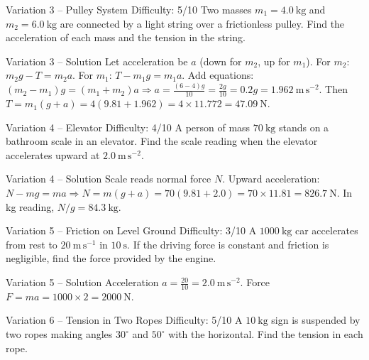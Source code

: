 \documentclass[11pt]{beamer}
\begin{document}
\begin{frame}[shrink=15]{Variation 3 – Pulley System \hfill Difficulty: 5/10}
Two masses $m_1 = 4.0\ \mathrm{kg}$ and $m_2 = 6.0\ \mathrm{kg}$ are connected by a light string over a frictionless pulley. Find the acceleration of each mass and the tension in the string.
\end{frame}

\begin{frame}{Variation 3 – Solution}
Let acceleration be $a$ (down for $m_2$, up for $m_1$). For $m_2$: $m_2g - T = m_2a$. For $m_1$: $T - m_1g = m_1a$.
Add equations: $(m_2 - m_1)g = (m_1+m_2)a \Rightarrow a = \frac{(6-4)g}{10} = \frac{2g}{10} = 0.2g = 1.962\ \mathrm{m\,s^{-2}}$.
Then $T = m_1(g+a) = 4(9.81+1.962) = 4\times11.772 = 47.09\ \mathrm{N}$.
\end{frame}

\begin{frame}[shrink=15]{Variation 4 – Elevator \hfill Difficulty: 4/10}
A person of mass $70\ \mathrm{kg}$ stands on a bathroom scale in an elevator. Find the scale reading when the elevator accelerates upward at $2.0\ \mathrm{m\,s^{-2}}$.
\end{frame}

\begin{frame}{Variation 4 – Solution}
Scale reads normal force $N$. Upward acceleration: $N - mg = ma \Rightarrow N = m(g+a) = 70(9.81+2.0) = 70\times11.81 = 826.7\ \mathrm{N}$.
In kg reading, $N/g = 84.3\ \mathrm{kg}$.
\end{frame}

\begin{frame}[shrink=15]{Variation 5 – Friction on Level Ground \hfill Difficulty: 3/10}
A $1000\ \mathrm{kg}$ car accelerates from rest to $20\ \mathrm{m\,s^{-1}}$ in $10\ \mathrm{s}$. If the driving force is constant and friction is negligible, find the force provided by the engine.
\end{frame}

\begin{frame}{Variation 5 – Solution}
Acceleration $a = \frac{20}{10} = 2.0\ \mathrm{m\,s^{-2}}$. Force $F = ma = 1000\times2 = 2000\ \mathrm{N}$.
\end{frame}

\begin{frame}[shrink=15]{Variation 6 – Tension in Two Ropes \hfill Difficulty: 5/10}
A $10\ \mathrm{kg}$ sign is suspended by two ropes making angles $30^\circ$ and $50^\circ$ with the horizontal. Find the tension in each rope.
\end{frame}
\end{document}
